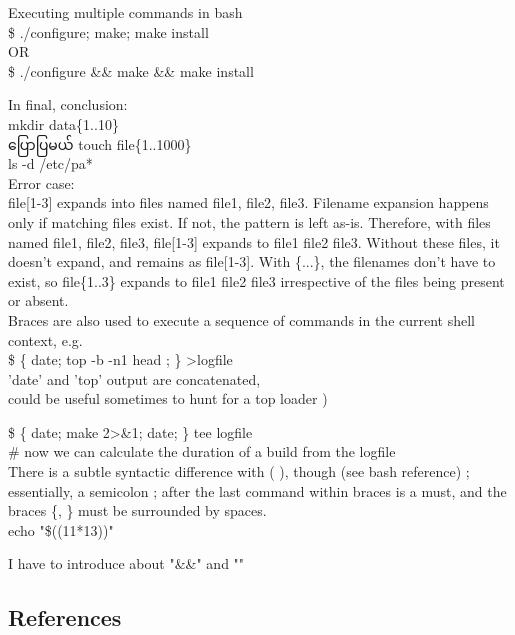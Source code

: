 \documentclass[11pt]{article}
\begin{document}
Executing multiple commands in bash\\
\$ ./configure; make; make install\\
OR\\
\$ ./configure \&\& make \&\& make install

    In final, conclusion:\\
mkdir data\{1..10\}\\
ပြောပြမယ် touch file\{1..1000\}\\
ls -d /etc/pa*\\
Error case:\\
file{[}1-3{]} expands into files named file1, file2, file3. Filename
expansion happens only if matching files exist. If not, the pattern is
left as-is. Therefore, with files named file1, file2, file3,
file{[}1-3{]} expands to file1 file2 file3. Without these files, it
doesn't expand, and remains as file{[}1-3{]}. With \{...\}, the
filenames don't have to exist, so file\{1..3\} expands to file1 file2
file3 irrespective of the files being present or absent.\\
Braces are also used to execute a sequence of commands in the current
shell context, e.g.\\
\$ \{ date; top -b -n1 \textbar{} head ; \} \textgreater{}logfile\\
'date' and 'top' output are concatenated,\\
could be useful sometimes to hunt for a top loader )

\$ \{ date; make 2\textgreater{}\&1; date; \} \textbar{} tee logfile\\
\# now we can calculate the duration of a build from the logfile\\
There is a subtle syntactic difference with ( ), though (see bash
reference) ; essentially, a semicolon ; after the last command within
braces is a must, and the braces \{, \} must be surrounded by spaces.\\
echo "\$((11*13))"

I have to introduce about "\&\&" and "\textbar{}\textbar{}"

    \subsection{References}\label{references}
\end{document}
